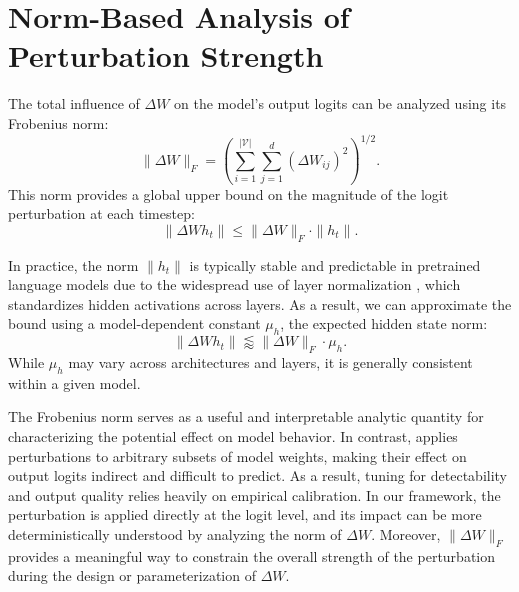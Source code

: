 \appendix
\section{Norm-Based Analysis of Perturbation Strength}
\label{app:norm_analysis}

The total influence of \( \Delta W \) on the model's output logits can be analyzed using its Frobenius norm:
\[
    \|\Delta W\|_F = \left( \sum_{i=1}^{|\mathcal{V}|} \sum_{j=1}^{d} (\Delta W_{ij})^2 \right)^{1/2}.
\]
This norm provides a global upper bound on the magnitude of the logit perturbation at each timestep:
\[
    \|\Delta W h_t\| \leq \|\Delta W\|_F \cdot \|h_t\|.
\]

In practice, the norm \( \|h_t\| \) is typically stable and predictable in pretrained language models due to the widespread use of layer normalization \citep{ba2016layer}, which standardizes hidden activations across layers. As a result, we can approximate the bound using a model-dependent constant \( \mu_h \), the expected hidden state norm:
\[
    \|\Delta W h_t\| \lessapprox \|\Delta W\|_F \cdot \mu_h.
\]
While \( \mu_h \) may vary across architectures and layers, it is generally consistent within a given model.

The Frobenius norm serves as a useful and interpretable analytic quantity for characterizing the potential effect on model behavior. In contrast, \citet{block2025gaussmark} applies perturbations to arbitrary subsets of model weights, making their effect on output logits indirect and difficult to predict. As a result, tuning for detectability and output quality relies heavily on empirical calibration. In our framework, the perturbation is applied directly at the logit level, and its impact can be more deterministically understood by analyzing the norm of \( \Delta W \). Moreover, \( \|\Delta W\|_F \) provides a meaningful way to constrain the overall strength of the perturbation during the design or parameterization of \( \Delta W \).
